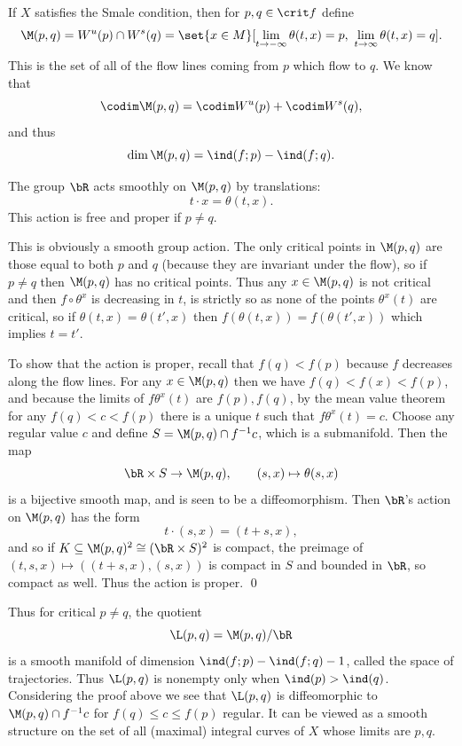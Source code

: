 If $X$ satisfies the Smale condition, then for $p,q\in\crit f$ define
$$ \M(p,q) = W^u(p)\cap W^s(q) = \set{x\in M}[\lim_{t\to-\infty}\theta(t,x)=p,\ \lim_{t\to\infty}\theta(t,x)=q] . $$
This is the set of all of the flow lines coming from $p$ which flow to $q$.
We know that
$$ \codim\M(p,q) = \codim W^u(p) + \codim W^s(q) , $$
and thus
$$ \dim\M(p,q) = \ind(f;p) - \ind(f;q) . $$

\bprop

    The group $\bR$ acts smoothly on $\M(p,q)$ by translations:
    $$ t\cdot x = \theta(t,x) . $$
    This action is free and proper if $p\neq q$.

\eprop

\bproof

    This is obviously a smooth group action.
    The only critical points in $\M(p,q)$ are those equal to both $p$ and $q$ (because they are invariant under
    the flow), so if $p\neq q$ then $\M(p,q)$ has no critical points.
    Thus any $x\in\M(p,q)$ is not critical and then $f\circ\theta^x$ is decreasing in $t$, is strictly so
    as none of the points $\theta^x(t)$ are critical, so if $\theta(t,x)=\theta(t',x)$ then
    $f(\theta(t,x))=f(\theta(t',x))$ which implies $t=t'$.

    To show that the action is proper, recall that $f(q)<f(p)$ because $f$ decreases along the flow lines.
    For any $x\in\M(p,q)$ then we have $f(q)<f(x)<f(p)$, and because the limits of $f\theta^x(t)$ are $f(p),f(q)$, by the mean value theorem
    for any $f(q)<c<f(p)$ there is a unique $t$ such that $f\theta^x(t)=c$.
    Choose any regular value $c$ and define $S=\M(p,q)\cap f^{-1}c$, which is a submanifold.
    Then the map
    $$ \bR\times S \to \M(p,q),\qquad (s,x) \mapsto \theta(s,x) $$
    is a bijective smooth map, and is seen to be a diffeomorphism.
    Then $\bR$'s action on $\M(p,q)$ has the form
    $$ t\cdot(s,x) = (t+s,x) , $$
    and so if $K\subseteq\M(p,q)^2\cong(\bR\times S)^2$ is compact, the preimage of $(t,s,x)\mapsto((t+s,x),(s,x))$ is compact in $S$ and bounded in $\bR$, so compact
    as well.
    Thus the action is proper.
    \qed

\eproof

Thus for critical $p\neq q$, the quotient
$$ \L(p,q) = \M(p,q)/\bR $$
is a smooth manifold of dimension $\ind(f;p)-\ind(f;q)-1$, called the {\emphcolor space of trajectories}.
Thus $\L(p,q)$ is nonempty only when $\ind(p)>\ind(q)$.
Considering the proof above we see that $\L(p,q)$ is diffeomorphic to $\M(p,q)\cap f^{-1}c$ for $f(q)\leq c\leq f(p)$ regular.
It can be viewed as a smooth structure on the set of all (maximal) integral curves of $X$ whose limits are $p,q$.

